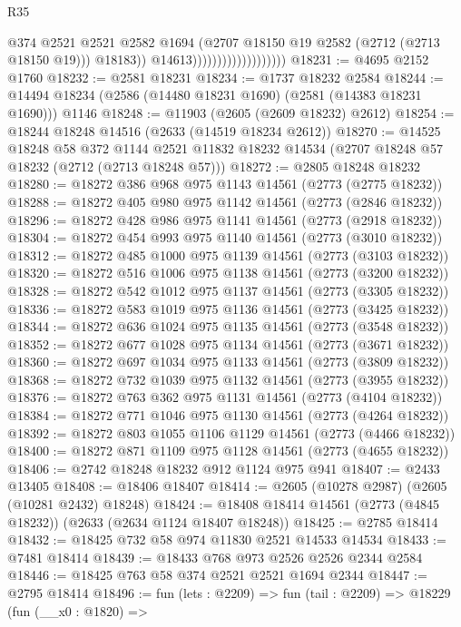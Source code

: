 \begin{lexlean}{R35}
\begin{coremodule}
                                              @374
                                              @2521
                                              @2521
                                              @2582
                                              @1694
                                              (@2707 @18150 @19 @2582 (@2712 (@2713 @18150 @19)))
                                              @18183))
                                          @14613)))))))))))))))))))
@18231 := @4695 @2152 @1760
@18232 := @2581 @18231
@18234 := @1737 @18232 @2584
@18244 := @14494 @18234 (@2586 (@14480 @18231 @1690) (@2581 (@14383 @18231 @1690))) @1146
@18248 := @11903 (@2605 (@2609 @18232) @2612)
@18254 := @18244 @18248 @14516 (@2633 (@14519 @18234 @2612))
@18270 := @14525
    @18248
    @58
    @372
    @1144
    @2521
    @11832
    @18232
    @14534
    (@2707 @18248 @57 @18232 (@2712 (@2713 @18248 @57)))
@18272 := @2805 @18248 @18232
@18280 := @18272 @386 @968 @975 @1143 @14561 (@2773 (@2775 @18232))
@18288 := @18272 @405 @980 @975 @1142 @14561 (@2773 (@2846 @18232))
@18296 := @18272 @428 @986 @975 @1141 @14561 (@2773 (@2918 @18232))
@18304 := @18272 @454 @993 @975 @1140 @14561 (@2773 (@3010 @18232))
@18312 := @18272 @485 @1000 @975 @1139 @14561 (@2773 (@3103 @18232))
@18320 := @18272 @516 @1006 @975 @1138 @14561 (@2773 (@3200 @18232))
@18328 := @18272 @542 @1012 @975 @1137 @14561 (@2773 (@3305 @18232))
@18336 := @18272 @583 @1019 @975 @1136 @14561 (@2773 (@3425 @18232))
@18344 := @18272 @636 @1024 @975 @1135 @14561 (@2773 (@3548 @18232))
@18352 := @18272 @677 @1028 @975 @1134 @14561 (@2773 (@3671 @18232))
@18360 := @18272 @697 @1034 @975 @1133 @14561 (@2773 (@3809 @18232))
@18368 := @18272 @732 @1039 @975 @1132 @14561 (@2773 (@3955 @18232))
@18376 := @18272 @763 @362 @975 @1131 @14561 (@2773 (@4104 @18232))
@18384 := @18272 @771 @1046 @975 @1130 @14561 (@2773 (@4264 @18232))
@18392 := @18272 @803 @1055 @1106 @1129 @14561 (@2773 (@4466 @18232))
@18400 := @18272 @871 @1109 @975 @1128 @14561 (@2773 (@4655 @18232))
@18406 := @2742 @18248 @18232 @912 @1124 @975 @941
@18407 := @2433 @13405
@18408 := @18406 @18407
@18414 := @2605 (@10278 @2987) (@2605 (@10281 @2432) @18248)
@18424 := @18408 @18414 @14561 (@2773 (@4845 @18232)) (@2633 (@2634 @1124 @18407 @18248))
@18425 := @2785 @18414
@18432 := @18425 @732 @58 @974 @11830 @2521 @14533 @14534
@18433 := @7481 @18414
@18439 := @18433 @768 @973 @2526 @2526 @2344 @2584
@18446 := @18425 @763 @58 @374 @2521 @2521 @1694 @2344
@18447 := @2795 @18414
@18496 := fun (lets : @2209) =>
  fun (tail : @2209) =>
  @18229
    (fun (__x0 : @1820) =>

\end{coremodule}
\end{lexlean}
